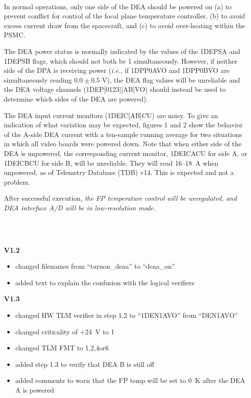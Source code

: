 \documentclass[11pt]{article}
\begin{document}
\normalsize
{} \\
\normalsize

In normal operations, only one side of the DEA should be powered on
(a) to prevent conflict for control of the focal plane temperature controller,
(b) to avoid excess current draw from the spacecraft, and (c) to avoid over-heating
within the PSMC.

The DEA power status is normally indicated by the values of the 1DEPSA and
1DEPSB flags, which should not both be 1 simultaneously.
However, if neither side of the DPA is receiving power
({\it i.e.}, if 1DPP0AVO and 1DPP0BVO are simultaneously reading $0.0 \pm 0.5$ V),
the DEA flag values will be unreliable and the DEA voltage
channels (1DEP[0123][AB]VO) should instead be used to determine which
sides of the DEA are powered).

The DEA input current monitors (1DEIC[AB]CU) are noisy.
To give an indication of what variation may be expected, figures 1 and 2
show the behavior of the A-side DEA current with a ten-sample running
average for two situations in which all video boards were powered down. Note that
when either side of the DEA is unpowered, the corresponding current monitor, 
1DEICACU for side A, or 1DEICBCU for side B, will be unreliable. They will read
16--18~A when unpowered, as of Telemetry Database (TDB) v14. This is expected and
not a problem.

After successful execution, {\em the FP temperature control will be unregulated,
and DEA interface A/D will be in low-resolution mode.}\\

\vspace{0.15in}
\normalsize
{} \\
\normalsize

\normalsize
{} \\
\normalsize

{\bf V1.2}
\begin{itemize}
\item changed filenames from ``turnon\_deaa'' to
``deaa\_on''
\item added text to explain the confusion with the logical verifiers
\end{itemize}

{\bf V1.3}
\begin{itemize}
\item changed HW TLM verifier in step 1.2 to ``1DEN1AVO'' from
``DEN1AVO''
\item changed criticality of +24~V to 1
\item changed TLM FMT to 1,2,4or6
\item added step 1.3 to verify that DEA B is still off
\item added comments to warn that the FP temp will be set to 0~K after the DEA A is powered
\end{itemize}
\end{document}
